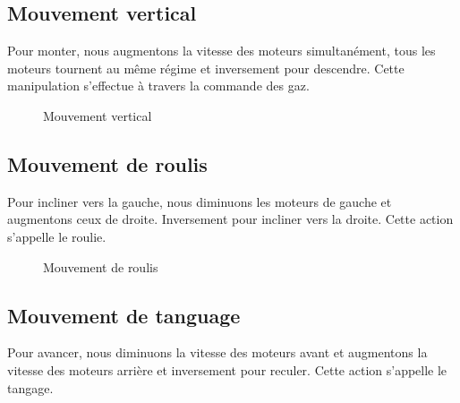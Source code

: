 	
	\subsection{Mouvement vertical}
	Pour monter, nous augmentons la vitesse des moteurs simultanément, tous les moteurs tournent au même régime et inversement pour descendre. Cette manipulation s'effectue à travers la commande des gaz.
	\begin{figure} [h]
	\begin{center}
		\centering
	\end{center}
	\caption{Mouvement vertical}
	\end{figure}
	\newpage
	\subsection{Mouvement de roulis}
	Pour incliner vers la gauche, nous diminuons les moteurs de gauche et augmentons ceux de droite. Inversement pour incliner vers la droite. Cette action s’appelle le roulie.
	\begin{figure} [h]
	\begin{center}
		\caption{Mouvement de roulis}
	\end{center}
	\end{figure}
	\subsection{Mouvement de tanguage}
	Pour avancer, nous diminuons la vitesse des moteurs avant et augmentons la vitesse des moteurs arrière et inversement pour reculer. Cette action s'appelle le tangage.
	
